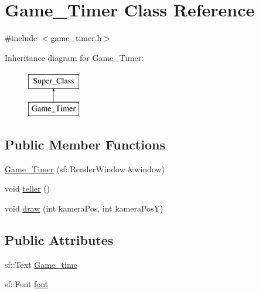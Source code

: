 \hypertarget{class_game___timer}{}\section{Game\+\_\+\+Timer Class Reference}
\label{class_game___timer}


{\ttfamily \#include $<$game\+\_\+timer.\+h$>$}

Inheritance diagram for Game\+\_\+\+Timer\+:\begin{figure}[H]
\begin{center}
\leavevmode
\includegraphics[height=2.000000cm]{class_game___timer}
\end{center}
\end{figure}
\subsection*{Public Member Functions}
\begin{DoxyCompactItemize}
\item 
\hyperlink{class_game___timer_a88916106390a164bc9bc6ba3ba15f016}{Game\+\_\+\+Timer} (sf\+::\+Render\+Window \&window)
\item 
void \hyperlink{class_game___timer_ab31ec234c05a3556d7f13cb2321b4bc4}{teller} ()
\item 
void \hyperlink{class_game___timer_aec7c78ad66d424bce367c3016fb98232}{draw} (int kamera\+Pos, int kamera\+PosY)
\end{DoxyCompactItemize}
\subsection*{Public Attributes}
\begin{DoxyCompactItemize}
\item 
sf\+::\+Text \hyperlink{class_game___timer_a220c82c41741426a03ce27b0d5bf4cdd}{Game\+\_\+time}
\item 
sf\+::\+Font \hyperlink{class_game___timer_a4d3db3baba86f24e5b69fc462d48868c}{font}
\end{DoxyCompactItemize}
